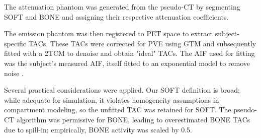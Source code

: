 The attenuation phantom was generated from the pseudo-CT by segmenting SOFT and BONE and assigning their respective attenuation coefficients.

The emission phantom was then registered to PET space to extract subject-specific TACs.
These TACs were corrected for PVE using GTM and subsequently fitted with a 2TCM to denoise and obtain "ideal" TACs.
The AIF used for fitting was the subject’s measured AIF, itself fitted to an exponential model to remove noise \cite{feng1993models}.

Several practical considerations were applied.
Our SOFT definition is broad; while adequate for simulation, it violates homogeneity assumptions in compartment modeling, so the unfitted TAC was retained for SOFT.
The pseudo-CT algorithm was permissive for BONE, leading to overestimated BONE TACs due to spill-in; empirically, BONE activity was scaled by 0.5.

